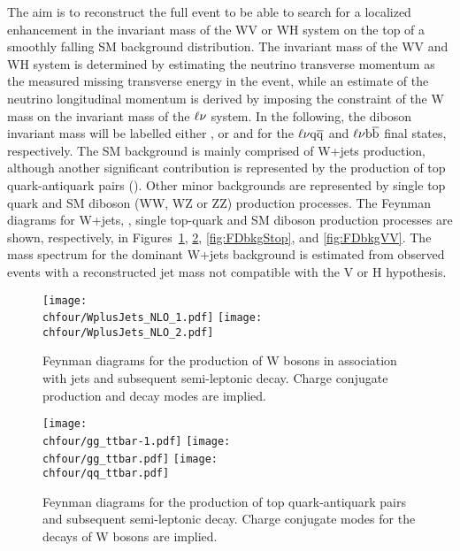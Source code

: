 The aim is to reconstruct the full event to be able to search for a localized enhancement in the invariant mass of the WV or WH system on the top of a smoothly falling SM background distribution.
The invariant mass of the WV and WH system is determined by estimating the neutrino transverse momentum as the measured missing transverse energy in the event,
while an estimate of the neutrino longitudinal momentum is derived by imposing the constraint of the W mass on the invariant mass of the $\ell\nu$ system.
In the following, the diboson invariant mass will be labelled either \mlvj, or \mWV and \mWH for the $\ell\nu\mathrm{q}\overline{\mathrm{q}}$ and $\ell\nu{\mathrm{b}\overline{\mathrm{b}}}$ final states, respectively.
The SM background is mainly comprised of W+jets production, although another significant contribution is represented by the production of top quark-antiquark pairs (\ttbar).
Other minor backgrounds are represented by single top quark and SM diboson (WW, WZ or ZZ) production processes.
The Feynman diagrams for W+jets, \ttbar, single top-quark and SM diboson production processes are shown, respectively, in Figures~\ref{fig:FDbkgWJets}, \ref{fig:FDbkgttbar}, \ref{fig:FDbkgStop}, and \ref{fig:FDbkgVV}.
The mass spectrum for the dominant W+jets background is estimated from observed events with a reconstructed jet mass not compatible with the V or H hypothesis.\\ 

\begin{figure}[!htb]
\centering
\texttt{[image: \\chfour/WplusJets\_NLO\_1.pdf]}
\texttt{[image: \\chfour/WplusJets\_NLO\_2.pdf]}
\caption{Feynman diagrams for the production of W bosons in association with jets and subsequent semi-leptonic decay. Charge conjugate production and decay modes are implied.}
\label{fig:FDbkgWJets}
\end{figure}

\begin{figure}[!htb]
\centering
\texttt{[image: \\chfour/gg\_ttbar-1.pdf]}
\texttt{[image: \\chfour/gg\_ttbar.pdf]}
\texttt{[image: \\chfour/qq\_ttbar.pdf]}
\caption{Feynman diagrams for the production of top quark-antiquark pairs and subsequent semi-leptonic decay. Charge conjugate modes for the decays of W bosons are implied.}
\label{fig:FDbkgttbar}
\end{figure}

